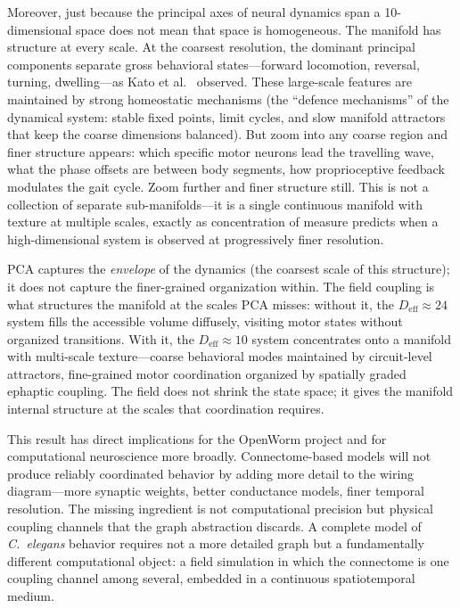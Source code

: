 \documentclass[12pt]{article}
\newcommand{\Deff}{D_{\mathrm{eff}}}
\begin{document}
Moreover, just because the principal axes of neural dynamics span a 10-dimensional space does not mean that space is homogeneous. The manifold has structure at every scale. At the coarsest resolution, the dominant principal components separate gross behavioral states---forward locomotion, reversal, turning, dwelling---as Kato et al.\ \cite{kato2015} observed. These large-scale features are maintained by strong homeostatic mechanisms (the ``defence mechanisms'' of the dynamical system: stable fixed points, limit cycles, and slow manifold attractors that keep the coarse dimensions balanced). But zoom into any coarse region and finer structure appears: which specific motor neurons lead the travelling wave, what the phase offsets are between body segments, how proprioceptive feedback modulates the gait cycle. Zoom further and finer structure still. This is not a collection of separate sub-manifolds---it is a single continuous manifold with texture at multiple scales, exactly as concentration of measure predicts when a high-dimensional system is observed at progressively finer resolution.

PCA captures the \textit{envelope} of the dynamics (the coarsest scale of this structure); it does not capture the finer-grained organization within. The field coupling is what structures the manifold at the scales PCA misses: without it, the $\Deff \approx 24$ system fills the accessible volume diffusely, visiting motor states without organized transitions. With it, the $\Deff \approx 10$ system concentrates onto a manifold with multi-scale texture---coarse behavioral modes maintained by circuit-level attractors, fine-grained motor coordination organized by spatially graded ephaptic coupling. The field does not shrink the state space; it gives the manifold internal structure at the scales that coordination requires.

This result has direct implications for the OpenWorm project and for computational neuroscience more broadly. Connectome-based models will not produce reliably coordinated behavior by adding more detail to the wiring diagram---more synaptic weights, better conductance models, finer temporal resolution. The missing ingredient is not computational precision but physical coupling channels that the graph abstraction discards. A complete model of \textit{C.~elegans} behavior requires not a more detailed graph but a fundamentally different computational object: a field simulation in which the connectome is one coupling channel among several, embedded in a continuous spatiotemporal medium.
\end{document}
